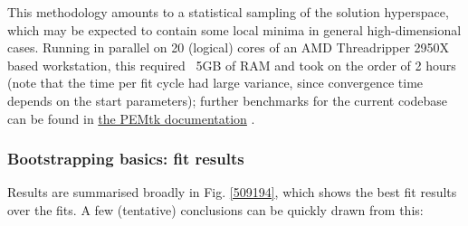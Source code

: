 \documentclass[10pt]{article}
\begin{document}
This methodology amounts to a statistical sampling of the solution hyperspace, which may be expected to contain some local minima in general high-dimensional cases.  Running in parallel on 20 (logical) cores of an AMD Threadripper 2950X based workstation, this required ~5GB of RAM and took on the order of 2 hours (note that the time per fit cycle had large variance, since convergence time depends on the start parameters); further benchmarks for the current codebase can be found in \href{https://pemtk.readthedocs.io/en/latest/index.html}{the PEMtk documentation} \cite{hockett2021PEMtkDocs}.


\subsubsection{Bootstrapping basics: fit results}

Results are summarised broadly in Fig. \ref{509194}, which shows the best fit results over the fits. A few (tentative) conclusions can be quickly drawn from this:
\end{document}
